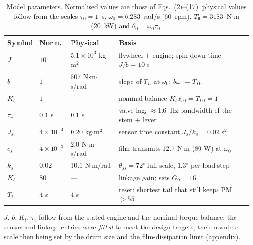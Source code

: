 \documentclass[conference]{IEEEtran}
\newcommand{\dg}{\ensuremath{^{\circ}}}
\begin{document}
\begin{table}[t]
\caption{Model parameters. Normalised values are those of Eqs.~(2)--(17); physical
values follow from the scales $\tau_0=1$~s, $\omega_0=6.283$~rad/s (60~rpm),
$T_0=3183$~N$\cdot$m (20~kW) and $\theta_0=\omega_0\tau_0$.}
\label{tab:params}
\centering
\footnotesize
\begin{tabular}{@{}lll>{\raggedright\arraybackslash}p{3.2cm}@{}}
\toprule
Symbol & Norm. & Physical & Basis \\
\midrule
$J$      & $10$     & $5.1\times10^{3}$ kg$\cdot$m$^2$ & flywheel $+$ engine; spin-down time $J/b=10$ s \\
$b$      & $1$      & $507$ N$\cdot$m$\cdot$s/rad & slope of $T_L$ at $\omega_0$; $b\omega_0=T_{L0}$ \\
$K_t$    & $1$      & --- & nominal balance $K_tx_{v0}=T_{L0}=1$ \\
$\tau_v$ & $0.1$ s  & $0.1$ s & valve lag; $\approx1.6$~Hz bandwidth of the stem $+$ lever \\
$J_s$    & $4\!\times\!10^{-4}$ & $0.20$ kg$\cdot$m$^2$ & sensor time constant $J_s/k_s=0.02$ s$^{2}$ \\
$c_s$    & $4\!\times\!10^{-3}$ & $2.0$ N$\cdot$m$\cdot$s/rad & film transmits $12.7$ N$\cdot$m ($80$ W) at $\omega_0$ \\
$k_s$    & $0.02$   & $10.1$ N$\cdot$m/rad & $\theta_{ss}=72\dg$ full scale, $1.3\dg$ per load step \\
$K_l$    & $80$     & --- & linkage gain; sets $G_0=16$ \\
$T_i$    & $4$ s    & $4$ s & reset: shortest tail that still keeps PM $>55\dg$ \\
\bottomrule
\end{tabular}
\vspace{2pt}
{\scriptsize\raggedright $J$, $b$, $K_t$, $\tau_v$ follow from the stated engine and the
nominal torque balance; the sensor and linkage entries were \emph{fitted} to meet the
design targets, their absolute scale then being set by the drum size and the
film-dissipation limit (appendix).
\par}
\end{table}
\end{document}
